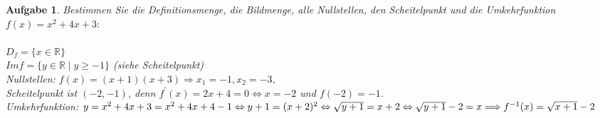 \documentclass[12pt]{article}
\newtheorem{exercise}[satz]{Aufgabe}
\begin{document}
\vspace{0.1cm}

\begin{exercise}
  Bestimmen Sie die Definitionsmenge, die Bildmenge, alle Nullstellen, den Scheitelpunkt und die Umkehrfunktion $f(x) = x^2+4x+3:$ \\ \\
  $D_f = \{x \in \mathbb{R}\}$\\
  $Im f = \{y \in \mathbb{R}\mid y\geq -1\}$ (siehe Scheitelpunkt)\\
  Nullstellen: $f(x) = (x+1)(x+3) \Rightarrow x_1 = -1, x_2 = -3$,\\
  Scheitelpunkt ist $(-2,-1)$, denn $f^\prime(x) = 2x+4 = 0 \Leftrightarrow x = -2$ und $f(-2) = -1$.\\
  Umkehrfunktion: $y = x^2+4x+3 = x^2+4x+4-1 \Leftrightarrow y+1=(x+2)^2 \Leftrightarrow \sqrt{y+1} = x+2 \Leftrightarrow \sqrt{y+1} -2 = x \hfill \Longrightarrow f^{-1}(x) = \sqrt{x+1}-2$
\end{exercise}
\end{document}

